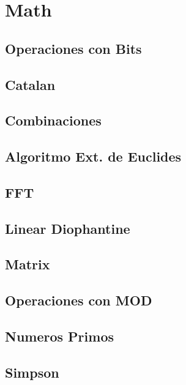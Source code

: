 \section{Math}
\subsection{Operaciones con Bits}
\raggedbottom
\hrulefill
\subsection{Catalan}
\raggedbottom
\hrulefill
\subsection{Combinaciones}
\raggedbottom
\hrulefill
\subsection{Algoritmo Ext. de Euclides}
\raggedbottom
\hrulefill
\subsection{FFT}
\raggedbottom
\hrulefill
\subsection{Linear Diophantine}
\raggedbottom
\hrulefill
\subsection{Matrix}
\raggedbottom
\hrulefill
\subsection{Operaciones con MOD}
\raggedbottom
\hrulefill
\subsection{Numeros Primos}
\raggedbottom
\hrulefill
\subsection{Simpson}
\raggedbottom
\hrulefill
\newpage


